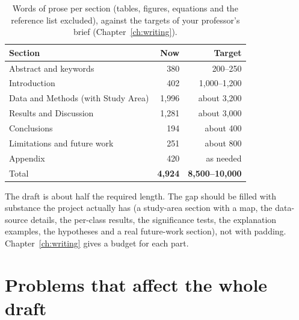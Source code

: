 \begin{table}[H]
\centering
\caption{Words of prose per section (tables, figures, equations and the reference list excluded), against the targets of your professor's brief (Chapter~\ref{ch:writing}).}
\label{tab:wordcounts}
\small
\begin{tabular}{lrr}
\toprule
Section & Now & Target \\
\midrule
Abstract and keywords & 380 & 200--250 \\
Introduction & 402 & 1,000--1,200 \\
Data and Methods (with Study Area) & 1,996 & about 3,200 \\
Results and Discussion & 1,281 & about 3,000 \\
Conclusions & 194 & about 400 \\
Limitations and future work & 251 & about 800 \\
Appendix & 420 & as needed \\
\midrule
Total & \textbf{4,924} & \textbf{8,500--10,000} \\
\bottomrule
\end{tabular}
\end{table}

The draft is about half the required length. The gap should be filled with substance the project actually has (a study-area section with a map, the data-source details, the per-class results, the significance tests, the explanation examples, the hypotheses and a real future-work section), not with padding. Chapter~\ref{ch:writing} gives a budget for each part.

\section{Problems that affect the whole draft}

